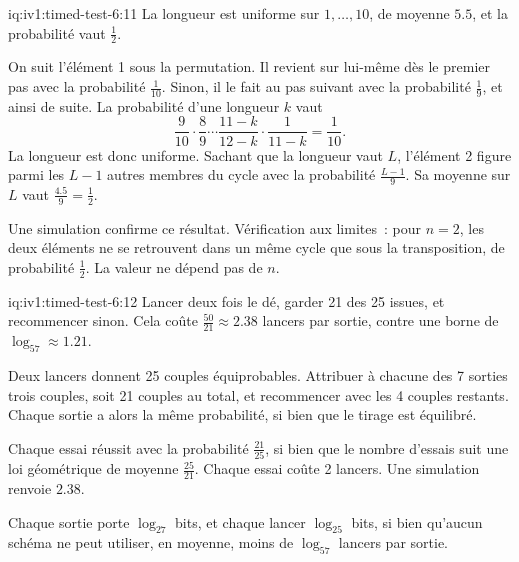 \begin{solution}{iq:iv1:timed-test-6:11}
La longueur est uniforme sur $1, \dots, 10$, de moyenne $5.5$, et la probabilité vaut $\frac12$.

On suit l'élément 1 sous la permutation. Il revient sur lui-même dès le premier pas avec la probabilité $\frac{1}{10}$. Sinon, il le fait au pas suivant avec la probabilité $\frac19$, et ainsi de suite. La probabilité d'une longueur $k$ vaut
\[
\frac{9}{10} \cdot \frac89 \cdots \frac{11 - k}{12 - k} \cdot \frac{1}{11 - k} = \frac{1}{10}.
\]
La longueur est donc uniforme. Sachant que la longueur vaut $L$, l'élément 2 figure parmi les $L - 1$ autres membres du cycle avec la probabilité $\frac{L - 1}{9}$. Sa moyenne sur $L$ vaut $\frac{4.5}{9} = \frac12$.

Une simulation confirme ce résultat. Vérification aux limites~: pour $n = 2$, les deux éléments ne se retrouvent dans un même cycle que sous la transposition, de probabilité $\frac12$. La valeur ne dépend pas de $n$.

\end{solution}

\begin{solution}{iq:iv1:timed-test-6:12}
Lancer deux fois le dé, garder 21 des 25 issues, et recommencer sinon. Cela coûte $\frac{50}{21} \approx 2.38$ lancers par sortie, contre une borne de $\log_57 \approx 1.21$.

Deux lancers donnent 25 couples équiprobables. Attribuer à chacune des 7 sorties trois couples, soit 21 couples au total, et recommencer avec les 4 couples restants. Chaque sortie a alors la même probabilité, si bien que le tirage est équilibré.

Chaque essai réussit avec la probabilité $\frac{21}{25}$, si bien que le nombre d'essais suit une loi géométrique de moyenne $\frac{25}{21}$. Chaque essai coûte 2 lancers. Une simulation renvoie $2.38$.

Chaque sortie porte $\log_27$ bits, et chaque lancer $\log_25$ bits, si bien qu'aucun schéma ne peut utiliser, en moyenne, moins de $\log_57$ lancers par sortie.


\end{solution}
